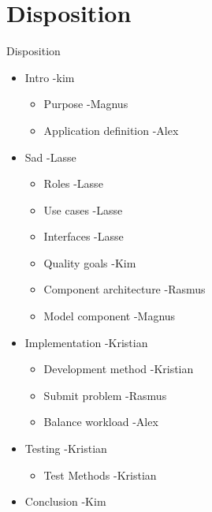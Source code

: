 \section*{Disposition}
\begin{frame}{Disposition}
\begin{itemize}
	
	
	\item Intro -kim
	\begin{itemize}
		\item Purpose -Magnus 
		\item Application definition -Alex
	\end{itemize}
	\item Sad -Lasse
	\begin{itemize}
		\item Roles -Lasse
		\item Use cases -Lasse
		\item Interfaces -Lasse
		\item Quality goals -Kim
		\item Component architecture -Rasmus
		\item Model component	-Magnus
	\end{itemize}
	\item Implementation -Kristian
	\begin{itemize}
		\item Development method -Kristian
		\item Submit problem -Rasmus
		\item Balance workload -Alex
	\end{itemize}	
	\item Testing -Kristian
	\begin{itemize}
		\item Test Methods -Kristian
	\end{itemize}
	\item Conclusion -Kim
\end{itemize}
\end{frame}
